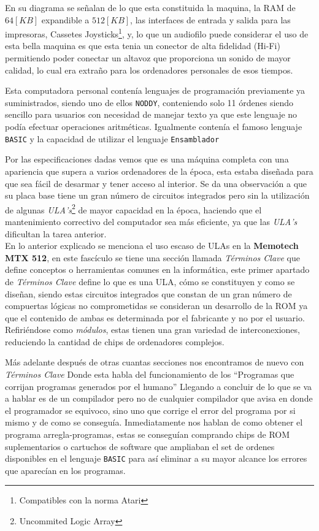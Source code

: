 \documentclass[12pt]{article}
\begin{document}
En su diagrama se señalan de lo que esta constituida la maquina, la RAM de $64[KB]$ expandible a $512[KB]$,
las interfaces de entrada y salida para las
impresoras, Cassetes Joysticks\footnote{Compatibles con la norma Atari}, y, lo que un audiofilo puede considerar
el uso de esta bella maquina es que esta tenia un conector de alta fidelidad (Hi-Fi) permitiendo poder
conectar un altavoz que proporciona un sonido de mayor calidad, lo cual era extraño para los ordenadores
personales de esos tiempos.

Esta computadora personal contenía lenguajes de programación previamente ya suministrados, siendo uno de
ellos \texttt{NODDY}, conteniendo solo 11 órdenes siendo sencillo para usuarios con necesidad de manejar texto
ya que este lenguaje no podía efectuar operaciones aritméticas. Igualmente contenía el famoso lenguaje
\texttt{BASIC} y la capacidad de utilizar el lenguaje \texttt{Ensamblador}\label{asm}

Por las especificaciones dadas vemos que es una máquina completa con una apariencia que supera a varios
ordenadores de la época, esta estaba diseñada para que sea fácil de desarmar y tener  acceso al interior.
Se da una observación a que su placa base tiene un gran número de circuitos integrados pero sin la
utilización de algunas \textit{ULA's}\footnote{Uncommited Logic Array} de mayor capacidad en la época,
haciendo que el mantenimiento correctivo del computador sea más eficiente, ya que las \textit{ULA's}
dificultan la tarea anterior.\\

En lo anterior explicado se menciona el uso escaso de ULAs en la \textbf{Memotech MTX 512}, en este fascículo
se tiene una sección llamada \textit{Términos Clave} que define conceptos o herramientas comunes en la
informática, este primer apartado de \textit{Términos Clave} define  lo que es una ULA, cómo se constituyen
y como se diseñan, siendo estas circuitos integrados que constan de un gran número de compuertas lógicas no
comprometidas se consideran un desarrollo de la ROM ya que el contenido de ambas es determinada por el
fabricante y no por el usuario. Refiriéndose como \textit{módulos}, estas tienen una gran variedad de
interconexiones, reduciendo la cantidad de chips de ordenadores complejos.

Más adelante después de otras cuantas secciones nos encontramos de nuevo con \textit{Términos Clave}
Donde esta habla del funcionamiento de los ``Programas que corrijan programas generados por el humano''
Llegando a concluir de lo que se va a hablar es de un compilador pero no de cualquier compilador que
avisa en donde el programador se equivoco, sino uno que corrige el error del programa por si mismo
y de como se conseguía. Inmediatamente nos hablan de como obtener el programa arregla-programas, estas
se conseguían comprando chips de ROM suplementarios o cartuchos de software que ampliaban el set de ordenes
disponibles en el lenguaje \texttt{BASIC} para así eliminar a su mayor alcance los errores que aparecían
en los programas.
\end{document}

